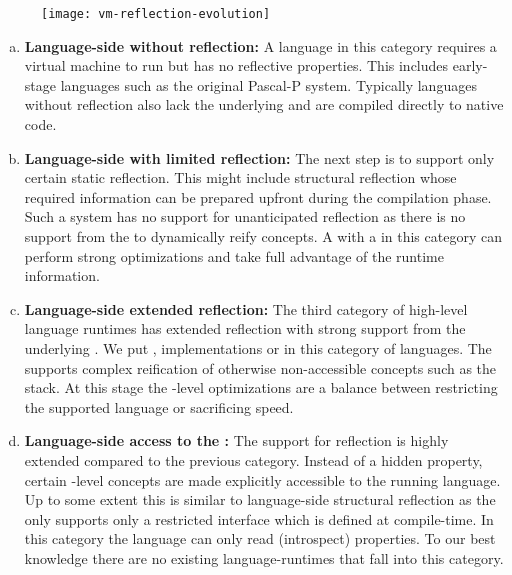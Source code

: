\begin{figure}[h]
\centering
\texttt{[image: vm-reflection-evolution]}
\end{figure}
%

\begin{enumerate}[a), nolistsep]
\item \textbf{Language-side without reflection:} A language in this category requires a virtual machine to run but has no reflective properties.
	This includes early-stage languages such as the original Pascal-P system.
	Typically languages without reflection also lack the underlying \VM and are compiled directly to native code.
	
\item \textbf{Language-side with limited reflection:}
	The next step is to support only certain static reflection.
	This might include structural reflection whose required information can be prepared upfront during the compilation phase.
	Such a system has no support for unanticipated reflection as there is no support from the \VM to dynamically reify concepts.
	A \VM with a \JIT in this category can perform strong optimizations and take full advantage of the runtime information.
	
\item \textbf{Language-side extended reflection:}
	The third category of high-level language runtimes has extended reflection with strong support from the underlying \VM.
	We put \PH, \ST implementations or \Self in this category of languages.
	The \VM supports complex reification of otherwise non-accessible concepts such as the stack.
	At this stage the \VM-level optimizations are a balance between restricting the supported language or sacrificing speed.
	
\item \textbf{Language-side access to the \VM:}
	The \VM support for reflection is highly extended compared to the previous category.
	Instead of a hidden property, certain \VM-level concepts are made explicitly accessible to the running language.
	Up to some extent this is similar to language-side structural reflection as the \VM only supports only a restricted interface which is defined at compile-time.
	In this category the language can only read (introspect) \VM properties.
	To our best knowledge there are no existing language-runtimes that fall into this category.


\end{enumerate}
